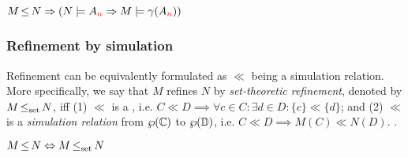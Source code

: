 \begin{theorem} \label{thm:traj-refines}
$M \operatorname{\leq} N \Rightarrow (N \models A_{\textcolor{red}{n}} \Rightarrow M \models \gamma(A_{\textcolor{red}{n}}))$
\end{theorem}

\noindent {}

\subsubsection{Refinement by simulation}

Refinement can be equivalently formulated as $\ll$ being a simulation relation. More specifically, we say that $M$ refines $N$ by \textit{set-theoretic  refinement}, denoted by $M \operatorname{\operatorname{\leq}_{\textrm{set}}} N$, iff (1) $\ll$ is a , i.e. $C \ll D \implies \forall c \in C: \exists d \in D: \{ c \} \ll \{ d \}$; and (2) $\ll$ is a \textit{simulation relation} from $\wp(\mathbb{C})$ to $\wp(\mathbb{D})$, i.e. $C \ll D \implies M(C) \ll N(D)$. .




\begin{theorem} \label{thm:traj-equal-set}
$M \operatorname{\leq} N \Leftrightarrow M \operatorname{\operatorname{\leq}_{\textrm{set}}} N$
\end{theorem}
